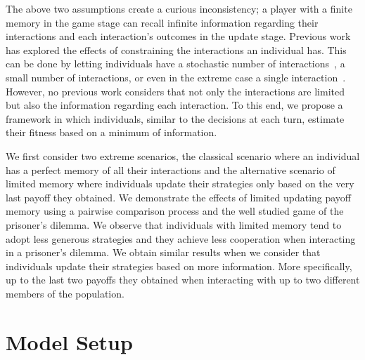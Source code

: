 \documentclass[11pt]{article}
\theoremstyle{plainCl1}
\theoremstyle{plainCl2}
\begin{document}
The above two assumptions create a curious inconsistency; a player with a finite
memory in the game stage can recall infinite information regarding their
interactions and each interaction's outcomes in the update stage. Previous work
has explored the effects of constraining the interactions an individual has.
This can be done by letting individuals have a stochastic number of
interactions~\cite{roca:PhysicalReview:2006, sanchez:JTB:2005,
Traulsen:JTB:2007}, a small number of interactions, or even in the extreme case
a single interaction~\cite{Woelfing:JTB:2009}. However, no previous work
considers that not only the interactions are limited but also the information
regarding each interaction. To this end, we propose a framework in which
individuals, similar to the decisions at each turn, estimate their fitness based
on a minimum of information.

We first consider two extreme scenarios, the classical scenario where an individual
has a perfect memory of all their interactions and the alternative scenario of
limited memory where individuals update their strategies only based on the very
last payoff they obtained. We demonstrate the effects of limited updating payoff
memory using a pairwise comparison process and the well studied game of the
prisoner's dilemma. We observe that individuals with limited memory tend to
adopt less generous strategies and they achieve less cooperation when
interacting in a prisoner's dilemma. We obtain similar results when we consider
that individuals update their strategies based on more information. More
specifically, up to the last two payoffs they obtained when interacting with up
to two different members of the population.

\section{Model Setup}\label{section:model}


\end{document}
